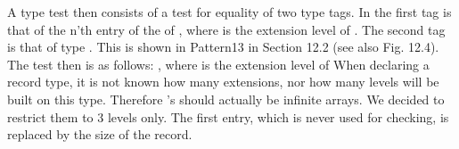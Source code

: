 A type test then consists of a test for equality of two type tags. In  the first tag is that of the n’th entry of the  of , where  is the extension level of . The second tag is that of type . This is shown in Pattern13 in Section 12.2 (see also Fig. 12.4). The test then is as follows:
\medskip
{}, where  is the extension level of 
\medskip
When declaring a record type, it is not known how many extensions, nor how many levels will be built on this type. Therefore ’s should actually be infinite arrays. We decided to restrict them to 3 levels only. The first entry, which is never used for checking, is replaced by the size of the record.







